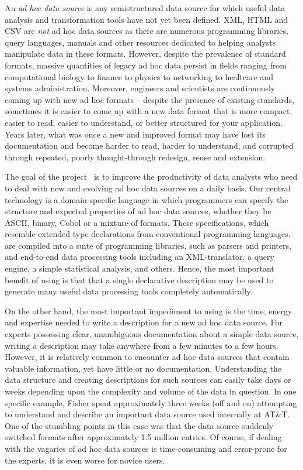 
An {\em ad hoc data source} is any semistructured data source
for which useful data analysis and transformation tools
have not yet been defined. XML, HTML and CSV are {\em not} 
ad hoc data sources as there are numerous programming libraries,
query languages, manuals and other resources dedicated to
helping analysts manipulate data in these formats.
However, despite the prevalence of standard formats,
massive quantities of legacy ad hoc data persist in fields ranging from
computational biology to finance to physics to networking to healtcare and
systems administration.  Moreover, engineers and scientists are continuously
coming up with new ad hoc formats -- despite the presence of existing 
standards, sometimes it is easier to come up with 
a new data format that is more compact, easier to read, easier to understand,
or better structured for your application.  Years later, what was once a new 
and improved format may have lost its documentation and become harder to read,
harder to understand, and corrupted through repeated, poorly thought-through
redesign, reuse and extension.

The goal of the \pads{} project~\cite{padsweb,fisher+:pads,fisher+:popl06,mandelbaum+:pads-ml} is to improve the
productivity of data analysts who need to deal with new and evolving
ad hoc data sources on a daily basis.  Our central technology is a
domain-specific language in which programmers can specify the
structure and expected properties of ad hoc data sources, whether they
be ASCII, binary, Cobol or a mixture of formats.  These
specifications, which resemble extended type declarations from
conventional programming languages, are compiled into a suite of
programming libraries, such as parsers and printers, and 
end-to-end data processing tools including an XML-translator,
a query engine, a simple statistical analysis, and others.
Hence, the most important benefit of using \pads{} is that
that a single declarative description may be used to generate many 
useful data processing tools completely automatically.

On the other hand, the most important impediment to using \pads{}
is the time, energy and expertise needed
to write a \pads{} description for a new ad hoc data source.
For experts possessing clear, unambiguous documentation about a
simple data source, writing a \pads{} description may take 
anywhere from a few minutes to a few hours.  However,
it is relatively common to encounter ad hoc data sources that 
contain valuable information, yet have little or no documentation.
Understanding the data structure and creating descriptions for such 
sources can easily take days or weeks depending upon the complexity
and volume of the data in question.  In one specific example, Fisher
spent approximately three weeks (off and on) attempting to understand
and describe an important data source used internally at AT\&T.  One
of the stumbling points in this case was that the data source suddenly 
switched formats after approximately 1.5 million entries.  Of course,
if dealing with the vagaries of ad hoc data sources is
time-consuming and error-prone for the experts, it is even worse for
novice users.

